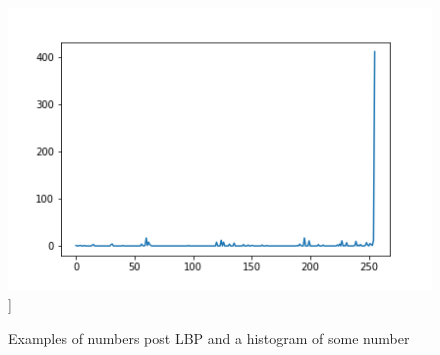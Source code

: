 \documentclass{article}
\begin{document}
\begin{figure}
       \includegraphics[width=1\textwidth]{histogram}]
           
  \caption{Examples of numbers post LBP and a histogram of some number}
  
\end{figure}            
\end{document}
